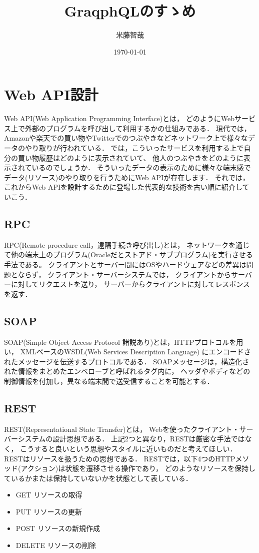 \documentclass[11pt,a4paper]{jsarticle}
\title{GraqphQLのすゝめ}
\author{米藤智哉}
\date{\today}
\begin{document}
\maketitle
%
%
\section{Web API設計}
Web API(Web Application Programming Interface)とは，
どのようにWebサービス上で外部のプログラムを呼び出して利用するかの仕組みである．
現代では，Amazonや楽天での買い物やTwitterでのつぶやきなどネットワーク上で様々なデータのやり取りが行われている．
では，こういったサービスを利用する上で自分の買い物履歴はどのように表示されていて、
他人のつぶやきをどのように表示されているのでしょうか．
そういったデータの表示のために様々な端末感でデータ(リソース)のやり取りを行うためにWeb APIが存在します．
それでは，これからWeb APIを設計するために登場した代表的な技術を古い順に紹介していこう．

\subsection{RPC}
RPC(Remote procedure call，遠隔手続き呼び出し)とは，
ネットワークを通じて他の端末上のプログラム(Oracleだとストアド・サブプログラム)を実行させる手法である。
クライアントとサーバー間にはOSやハードウェアなどの差異は問題とならず，
クライアント・サーバーシステムでは，
クライアントからサーバーに対してリクエストを送り，
サーバーからクライアントに対してレスポンスを返す．

\subsection{SOAP}
SOAP(Simple Object Access Protocol 諸説あり)とは，HTTPプロトコルを用い，
XMLベースのWSDL(Web Services Description Language)
にエンコードされたメッセージを伝送するプロトコルである．
SOAPメッセージは，構造化された情報をまとめたエンベローブと呼ばれるタグ内に，
ヘッダやボディなどの制御情報を付加し，異なる端末間で送受信することを可能とする．

\subsection{REST}
REST(Representational State Transfer)とは，
Webを使ったクライアント・サーバーシステムの設計思想である．
上記2つと異なり，RESTは厳密な手法ではなく，
こうすると良いという思想やスタイルに近いものだと考えてほしい．\\
RESTはリソースを扱うための思想である．
RESTでは，以下4つのHTTPメソッド(アクション)は状態を遷移させる操作であり，
どのようなリソースを保持しているかまたは保持していないかを状態として表している．
\begin{itemize}
    \item GET リソースの取得
    \item PUT リソースの更新
    \item POST リソースの新規作成
    \item DELETE リソースの削除
\end{itemize}
\end{document}

